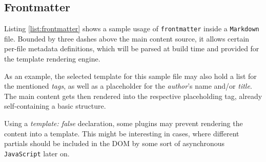 \subsection{Frontmatter}
\label{sec:buildpipelines-frontmatter}



Listing \ref{list:frontmatter} shows a sample usage of \texttt{frontmatter} inside a \texttt{Markdown} file. Bounded by three dashes above the main content source, it allows certain per-file metadata definitions, which will be parsed at build time and provided for the template rendering engine.

As an example, the selected template for this sample file may also hold a list for the mentioned \emph{tags}, as well as a placeholder for the \emph{author}'s name and/or \emph{title}. The main content gets then rendered into the respective placeholding tag, already self-containing a basic structure.

Using a \emph{template: false} declaration, some plugins may prevent rendering the content into a template. This might be interesting in cases, where different partials should be included in the DOM by some sort of asynchronous \texttt{JavaScript} later on.
